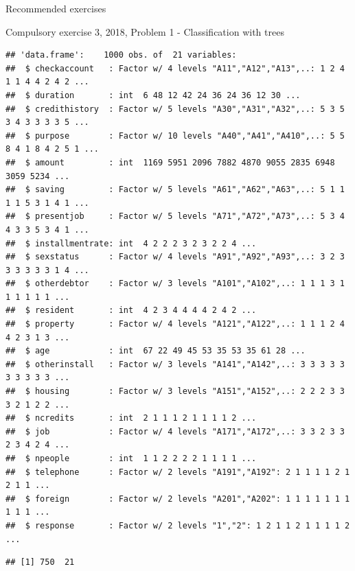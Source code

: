 \documentclass[ignorenonframetext,]{beamer}
\newenvironment{Shaded}{\begin{snugshade}}{\end{snugshade}}
\newcommand{\KeywordTok}[1]{\textcolor[rgb]{0.13,0.29,0.53}{\textbf{#1}}}
\newcommand{\DataTypeTok}[1]{\textcolor[rgb]{0.13,0.29,0.53}{#1}}
\newcommand{\DecValTok}[1]{\textcolor[rgb]{0.00,0.00,0.81}{#1}}
\newcommand{\FloatTok}[1]{\textcolor[rgb]{0.00,0.00,0.81}{#1}}
\newcommand{\StringTok}[1]{\textcolor[rgb]{0.31,0.60,0.02}{#1}}
\newcommand{\CommentTok}[1]{\textcolor[rgb]{0.56,0.35,0.01}{\textit{#1}}}
\newcommand{\OtherTok}[1]{\textcolor[rgb]{0.56,0.35,0.01}{#1}}
\newcommand{\OperatorTok}[1]{\textcolor[rgb]{0.81,0.36,0.00}{\textbf{#1}}}
\newcommand{\NormalTok}[1]{#1}
\begin{document}
\begin{frame}[fragile]{Recommended exercises}
\begin{block}{Compulsory exercise 3, 2018, Problem 1 - Classification
with trees}
\begin{verbatim}
## 'data.frame':    1000 obs. of  21 variables:
##  $ checkaccount   : Factor w/ 4 levels "A11","A12","A13",..: 1 2 4 1 1 4 4 2 4 2 ...
##  $ duration       : int  6 48 12 42 24 36 24 36 12 30 ...
##  $ credithistory  : Factor w/ 5 levels "A30","A31","A32",..: 5 3 5 3 4 3 3 3 3 5 ...
##  $ purpose        : Factor w/ 10 levels "A40","A41","A410",..: 5 5 8 4 1 8 4 2 5 1 ...
##  $ amount         : int  1169 5951 2096 7882 4870 9055 2835 6948 3059 5234 ...
##  $ saving         : Factor w/ 5 levels "A61","A62","A63",..: 5 1 1 1 1 5 3 1 4 1 ...
##  $ presentjob     : Factor w/ 5 levels "A71","A72","A73",..: 5 3 4 4 3 3 5 3 4 1 ...
##  $ installmentrate: int  4 2 2 2 3 2 3 2 2 4 ...
##  $ sexstatus      : Factor w/ 4 levels "A91","A92","A93",..: 3 2 3 3 3 3 3 3 1 4 ...
##  $ otherdebtor    : Factor w/ 3 levels "A101","A102",..: 1 1 1 3 1 1 1 1 1 1 ...
##  $ resident       : int  4 2 3 4 4 4 4 2 4 2 ...
##  $ property       : Factor w/ 4 levels "A121","A122",..: 1 1 1 2 4 4 2 3 1 3 ...
##  $ age            : int  67 22 49 45 53 35 53 35 61 28 ...
##  $ otherinstall   : Factor w/ 3 levels "A141","A142",..: 3 3 3 3 3 3 3 3 3 3 ...
##  $ housing        : Factor w/ 3 levels "A151","A152",..: 2 2 2 3 3 3 2 1 2 2 ...
##  $ ncredits       : int  2 1 1 1 2 1 1 1 1 2 ...
##  $ job            : Factor w/ 4 levels "A171","A172",..: 3 3 2 3 3 2 3 4 2 4 ...
##  $ npeople        : int  1 1 2 2 2 2 1 1 1 1 ...
##  $ telephone      : Factor w/ 2 levels "A191","A192": 2 1 1 1 1 2 1 2 1 1 ...
##  $ foreign        : Factor w/ 2 levels "A201","A202": 1 1 1 1 1 1 1 1 1 1 ...
##  $ response       : Factor w/ 2 levels "1","2": 1 2 1 1 2 1 1 1 1 2 ...
\end{verbatim}

\begin{Shaded}
\end{Shaded}

\begin{verbatim}
## [1] 750  21
\end{verbatim}


\end{block}
\end{frame}
\end{document}
